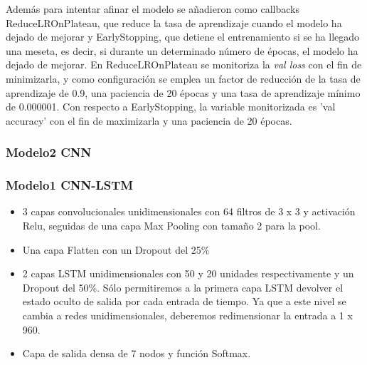 \documentclass[11pt,a4paper,spanish]{book}
\begin{document}
		Además para intentar afinar el modelo se añadieron como callbacks ReduceLROnPlateau, que reduce la tasa de aprendizaje cuando el modelo ha dejado de mejorar y EarlyStopping, que detiene el entrenamiento si se ha llegado una meseta, es decir, si durante un determinado número de épocas, el modelo ha dejado de mejorar. En ReduceLROnPlateau se monitoriza la \emph{val loss} con el fin de minimizarla, y como configuración se emplea un factor de reducción de la tasa de aprendizaje de 0.9, una paciencia de 20 épocas y una tasa de aprendizaje mínimo de 0.000001.
		Con respecto a EarlyStopping, la variable monitorizada es 'val accuracy' con el fin de maximizarla y una paciencia de 20 épocas.
		
		
		
		\subsubsection{Modelo2 CNN}
		
	
		\subsubsection{Modelo1 CNN-LSTM}
		\begin{itemize}
			\item 3 capas convolucionales unidimensionales con 64 filtros de 3 x 3 y activación Relu, seguidas de una capa Max Pooling con tamaño 2 para la pool.
			
			\item Una capa Flatten con un Dropout del 25\%
			
			\item 2 capas LSTM unidimensionales con 50 y 20 unidades respectivamente y un Dropout del 50\%. Sólo permitiremos a la primera capa LSTM devolver el estado oculto de salida por cada entrada de tiempo. Ya que a este nivel se cambia a redes unidimensionales, deberemos redimensionar la entrada a 1 x 960.
			
			\item Capa de salida densa de 7 nodos y función Softmax.
			
		\end{itemize}


	
\end{document}
